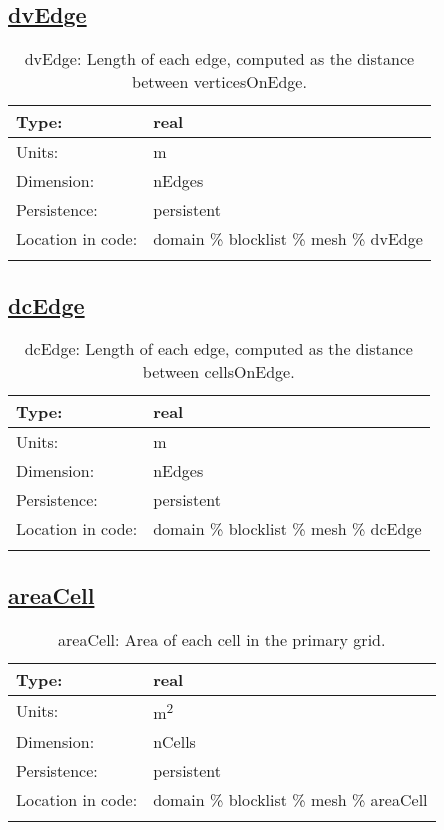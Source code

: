 \subsection[dvEdge]{\hyperref[sec:var_tab_mesh]{dvEdge}}
\label{subsec:var_sec_mesh_dvEdge}
\begin{center}
\begin{longtable}{| p{2.0in} | p{4.0in} |}
        \hline 
        Type: & real \\
        \hline 
        Units: & \si{m} \\
        \hline 
        Dimension: & nEdges \\
        \hline 
        Persistence: & persistent \\
        \hline 
         Location in code: & domain \% blocklist \% mesh \% dvEdge \\
         \hline 
    \caption{dvEdge: Length of each edge, computed as the distance between verticesOnEdge.}
\end{longtable}
\end{center}
\subsection[dcEdge]{\hyperref[sec:var_tab_mesh]{dcEdge}}
\label{subsec:var_sec_mesh_dcEdge}
\begin{center}
\begin{longtable}{| p{2.0in} | p{4.0in} |}
        \hline 
        Type: & real \\
        \hline 
        Units: & \si{m} \\
        \hline 
        Dimension: & nEdges \\
        \hline 
        Persistence: & persistent \\
        \hline 
         Location in code: & domain \% blocklist \% mesh \% dcEdge \\
         \hline 
    \caption{dcEdge: Length of each edge, computed as the distance between cellsOnEdge.}
\end{longtable}
\end{center}
\subsection[areaCell]{\hyperref[sec:var_tab_mesh]{areaCell}}
\label{subsec:var_sec_mesh_areaCell}
\begin{center}
\begin{longtable}{| p{2.0in} | p{4.0in} |}
        \hline 
        Type: & real \\
        \hline 
        Units: & \si{m^2} \\
        \hline 
        Dimension: & nCells \\
        \hline 
        Persistence: & persistent \\
        \hline 
         Location in code: & domain \% blocklist \% mesh \% areaCell \\
         \hline 
    \caption{areaCell: Area of each cell in the primary grid.}
\end{longtable}
\end{center}
